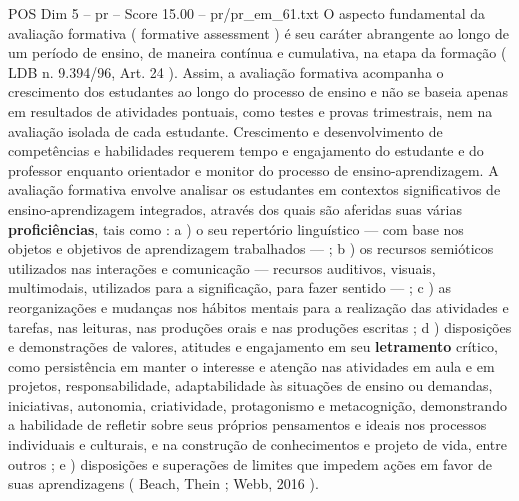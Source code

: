 \begin{textsample}{POS Dim 5 – pr – Score 15.00 – pr/pr\_em\_61.txt}
O aspecto fundamental da avaliação formativa ( formative assessment ) é seu caráter abrangente ao longo de um período de ensino, de maneira contínua e cumulativa, na etapa da formação ( LDB n. 9.394/96, Art. 24 ).
Assim, a avaliação formativa acompanha o crescimento dos estudantes ao longo do processo de ensino e não se baseia apenas em resultados de atividades pontuais, como testes e provas trimestrais, nem na avaliação isolada de cada estudante.
Crescimento e desenvolvimento de competências e habilidades requerem tempo e engajamento do estudante e do professor enquanto orientador e monitor do processo de ensino-aprendizagem.
A avaliação formativa envolve analisar os estudantes em contextos significativos de ensino-aprendizagem integrados, através dos quais são aferidas suas várias \textbf{proficiências}, tais como : a ) o seu repertório linguístico — com base nos objetos e objetivos de aprendizagem trabalhados — ; b ) os recursos semióticos utilizados nas interações e comunicação — recursos auditivos, visuais, multimodais, utilizados para a significação, para fazer sentido — ; c ) as reorganizações e mudanças nos hábitos mentais para a realização das atividades e tarefas, nas leituras, nas produções orais e nas produções escritas ; d ) disposições e demonstrações de valores, atitudes e engajamento em seu \textbf{letramento} crítico, como persistência em manter o interesse e atenção nas atividades em aula e em projetos, responsabilidade, adaptabilidade às situações de ensino ou demandas, iniciativas, autonomia, criatividade, protagonismo e metacognição, demonstrando a habilidade de refletir sobre seus próprios pensamentos e ideais nos processos individuais e culturais, e na construção de conhecimentos e projeto de vida, entre outros ; e ) disposições e superações de limites que impedem ações em favor de suas aprendizagens ( Beach, Thein ; Webb, 2016 ).

\end{textsample}
